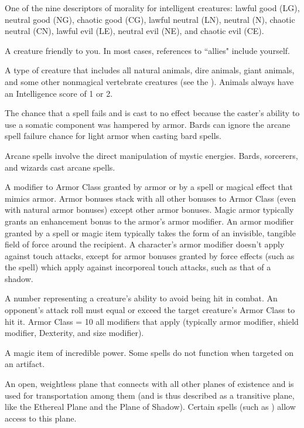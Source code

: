  One of the nine descriptors of morality for intelligent 
creatures: lawful good (LG), neutral good (NG), chaotic good (CG), lawful neutral 
(LN), neutral (N), chaotic neutral (CN), lawful 
evil (LE), neutral evil (NE), and chaotic evil (CE). 

 A creature friendly to you. In most cases, 
references to ``allies" include yourself. 

 A type of creature that includes 
all natural animals, dire animals, giant 
animals, and some other nonmagical 
vertebrate creatures (see the ). 
Animals always have an Intelligence score of 1 
or 2. 

 The chance that a spell 
fails and is cast to no effect because the 
caster's ability to use a somatic 
component was hampered by armor. 
Bards can ignore the arcane spell failure 
chance for light armor when casting bard 
spells. 

 Arcane spells involve the direct manipulation of 
mystic energies. Bards, sorcerers, and wizards cast arcane spells. 

 A modifier to Armor Class granted by armor or by a spell or magical effect that mimics armor. Armor bonuses stack with 
all other bonuses to Armor Class (even with natural armor bonuses) 
except other armor bonuses. Magic armor typically grants an 
enhancement bonus to the armor's armor modifier. An armor modifier
granted by a spell or magic item typically takes the form of an 
invisible, tangible field of force around the recipient. A character's armor modifier doesn't apply against touch attacks, except for armor bonuses 
granted by force effects (such as the  spell) which apply 
against incorporeal touch attacks, such as that of a shadow. 

 A number representing a creature's 
ability to avoid being hit in combat. An opponent's attack 
roll must equal or exceed the target creature's Armor Class 
to hit it. Armor Class = 10 \add all modifiers that apply 
(typically armor modifier, shield modifier, Dexterity, and size modifier). 

 A magic item of incredible power. 
Some spells do not function when targeted on an artifact. 

 An open, weightless plane 
that connects with all other planes of 
existence and is used for transportation 
among them (and is thus described as a 
transitive plane, like the Ethereal Plane 
and the Plane of Shadow). Certain 
spells (such as  ) allow 
access to this plane. 

